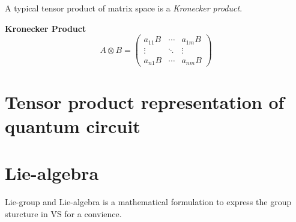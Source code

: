 A typical tensor product of matrix space is a \textit{Kronecker product}.

\begin{definition}{\textbf{Kronecker Product}}
    \begin{equation}
        A \otimes B = \begin{pmatrix}
            a_{11} B & \cdots & a_{1m} B\\
            \vdots & \ddots & \vdots \\
            a_{n1} B & \cdots & a_{nm} B
        \end{pmatrix}
    \end{equation}
\end{definition}

\section{Tensor product representation of quantum circuit}




\section{Lie-algebra}
Lie-group and Lie-algebra is a mathematical formulation to express the group sturcture in VS for a convience.


